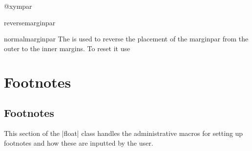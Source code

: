 %
 \begin{docCommand}{@xympar} {}
    \begin{teX}
\def \@xympar{%
  \ifnum\@floatpenalty <\z@\@cons\@currlist\@marbox\fi
  \setbox\@tempboxa
    \color@vbox
      \vbox \bgroup
  \end@float
  \@ignorefalse
  \@esphack
}
    \end{teX}
 \end{docCommand}
%
 \begin{docCommand}{reversemarginpar} {}
 \begin{docCommand}{normalmarginpar} {}
 The  is used to reverse the placement of the marginpar from
 the outer to the inner margins. To reset it use 
    \begin{teX}
\def\reversemarginpar{\global\@mparbottom\z@ \@reversemargintrue}
\def\normalmarginpar{\global\@mparbottom\z@ \@reversemarginfalse}
    \end{teX}
 \end{docCommand}
 \end{docCommand}
%
\section{Footnotes}

    \begin{teX}
    \end{teX}
%
 \subsection{Footnotes}
%
This section of the |float| class handles the administrative macros for setting up footnotes
and how these are inputted by the user.


